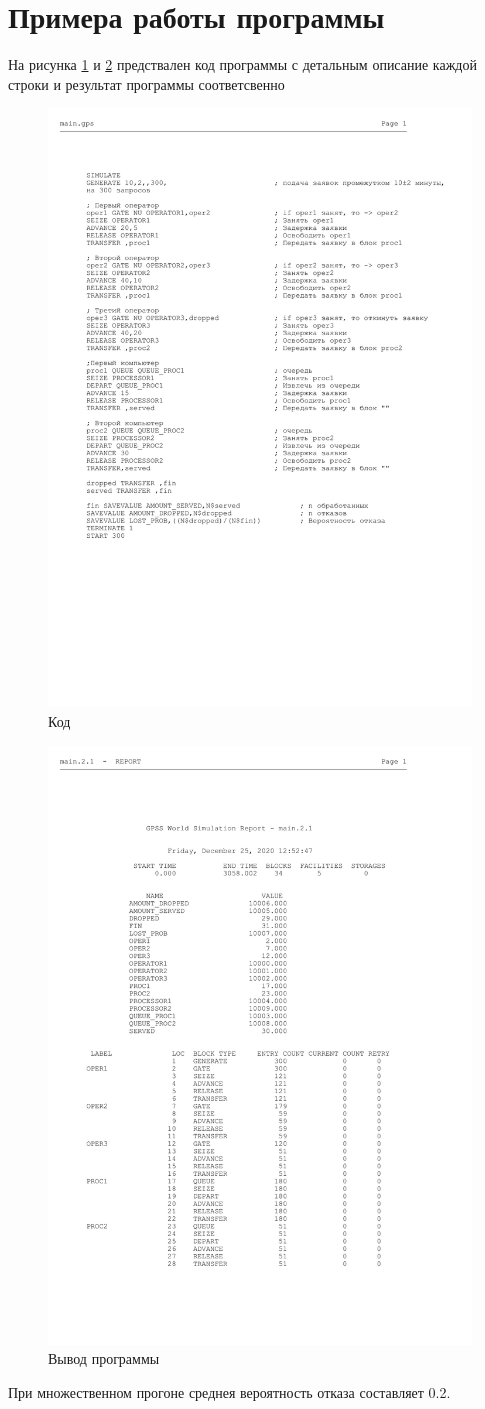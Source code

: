 \section{Примера работы программы}

На рисунка \ref{fig:code} и \ref{fig:result} предствален код программы с детальным описание каждой строки и результат программы соответсвенно

\begin{figure}[h]
	\centering
	\includegraphics[width=0.7\linewidth]{src/code}
	\caption{Код}
	\label{fig:code}
\end{figure}

\begin{figure}[h]
	\centering
	\includegraphics[width=0.7\linewidth]{src/result}
	\caption{Вывод программы}
	\label{fig:result}
\end{figure}


При множественном прогоне среднея вероятность отказа составляет 0.2.